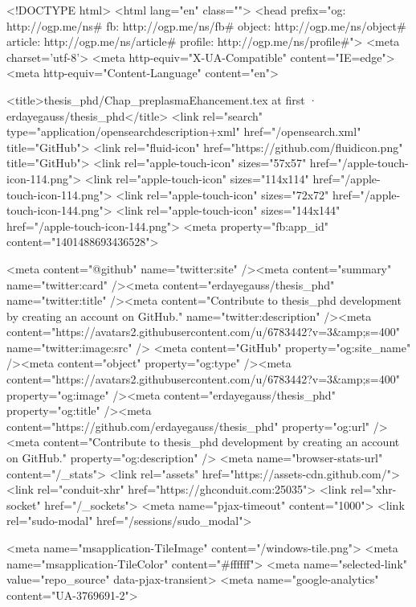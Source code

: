 


<!DOCTYPE html>
<html lang="en" class="">
  <head prefix="og: http://ogp.me/ns# fb: http://ogp.me/ns/fb# object: http://ogp.me/ns/object# article: http://ogp.me/ns/article# profile: http://ogp.me/ns/profile#">
    <meta charset='utf-8'>
    <meta http-equiv="X-UA-Compatible" content="IE=edge">
    <meta http-equiv="Content-Language" content="en">
    
    
    <title>thesis_phd/Chap_preplasmaEhancement.tex at first · erdayegauss/thesis_phd</title>
    <link rel="search" type="application/opensearchdescription+xml" href="/opensearch.xml" title="GitHub">
    <link rel="fluid-icon" href="https://github.com/fluidicon.png" title="GitHub">
    <link rel="apple-touch-icon" sizes="57x57" href="/apple-touch-icon-114.png">
    <link rel="apple-touch-icon" sizes="114x114" href="/apple-touch-icon-114.png">
    <link rel="apple-touch-icon" sizes="72x72" href="/apple-touch-icon-144.png">
    <link rel="apple-touch-icon" sizes="144x144" href="/apple-touch-icon-144.png">
    <meta property="fb:app_id" content="1401488693436528">

      <meta content="@github" name="twitter:site" /><meta content="summary" name="twitter:card" /><meta content="erdayegauss/thesis_phd" name="twitter:title" /><meta content="Contribute to thesis_phd development by creating an account on GitHub." name="twitter:description" /><meta content="https://avatars2.githubusercontent.com/u/6783442?v=3&amp;s=400" name="twitter:image:src" />
      <meta content="GitHub" property="og:site_name" /><meta content="object" property="og:type" /><meta content="https://avatars2.githubusercontent.com/u/6783442?v=3&amp;s=400" property="og:image" /><meta content="erdayegauss/thesis_phd" property="og:title" /><meta content="https://github.com/erdayegauss/thesis_phd" property="og:url" /><meta content="Contribute to thesis_phd development by creating an account on GitHub." property="og:description" />
      <meta name="browser-stats-url" content="/_stats">
    <link rel="assets" href="https://assets-cdn.github.com/">
    <link rel="conduit-xhr" href="https://ghconduit.com:25035">
    <link rel="xhr-socket" href="/_sockets">
    <meta name="pjax-timeout" content="1000">
    <link rel="sudo-modal" href="/sessions/sudo_modal">

    <meta name="msapplication-TileImage" content="/windows-tile.png">
    <meta name="msapplication-TileColor" content="#ffffff">
    <meta name="selected-link" value="repo_source" data-pjax-transient>
      <meta name="google-analytics" content="UA-3769691-2">

